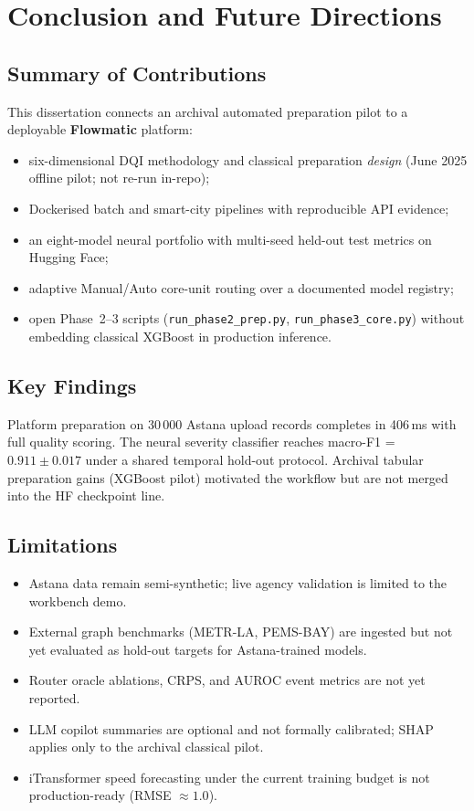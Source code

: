 %
%

\chapter{Conclusion and Future Directions}
\label{chap:conclusion}

\section{Summary of Contributions}

This dissertation connects an archival automated preparation pilot to a deployable \textbf{Flowmatic} platform:
\begin{itemize}
  \item six-dimensional DQI methodology and classical preparation \emph{design} (June 2025 offline pilot; not re-run in-repo);
  \item Dockerised batch and smart-city pipelines with reproducible API evidence;
  \item an eight-model neural portfolio with multi-seed held-out test metrics on Hugging Face;
  \item adaptive Manual/Auto core-unit routing over a documented model registry;
  \item open Phase~2--3 scripts (\texttt{run\_phase2\_prep.py}, \texttt{run\_phase3\_core.py}) without embedding classical XGBoost in production inference.
\end{itemize}

\section{Key Findings}

Platform preparation on 30\,000 Astana upload records completes in 406\,ms with full quality scoring. The neural severity classifier reaches macro-F1 = $0.911 \pm 0.017$ under a shared temporal hold-out protocol. Archival tabular preparation gains (XGBoost pilot) motivated the workflow but are not merged into the HF checkpoint line.

\section{Limitations}

\begin{itemize}
  \item Astana data remain semi-synthetic; live agency validation is limited to the workbench demo.
  \item External graph benchmarks (METR-LA, PEMS-BAY) are ingested but not yet evaluated as hold-out targets for Astana-trained models.
  \item Router oracle ablations, CRPS, and AUROC event metrics are not yet reported.
  \item LLM copilot summaries are optional and not formally calibrated; SHAP applies only to the archival classical pilot.
  \item iTransformer speed forecasting under the current training budget is not production-ready (RMSE $\approx 1.0$).
\end{itemize}

